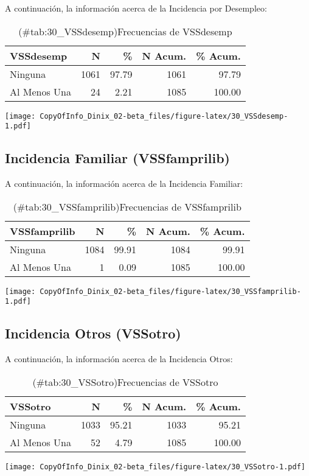 \documentclass[
]{article}
\begin{document}
A continuación, la información acerca de la Incidencia por Desempleo:

\begin{table}

\caption{(\#tab:30_VSSdesemp)Frecuencias de VSSdesemp}
\centering
\begin{tabular}[t]{lrrrr}
\toprule
VSSdesemp & N & \% & N Acum. & \% Acum.\\
\midrule
Ninguna & 1061 & 97.79 & 1061 & 97.79\\
Al Menos Una & 24 & 2.21 & 1085 & 100.00\\
\bottomrule
\end{tabular}
\end{table}

\texttt{[image: CopyOfInfo\_Dinix\_02-beta\_files/figure-latex/30\_VSSdesemp-1.pdf]}

\subsection{Incidencia Familiar (VSSfamprilib)}\label{incidencia-familiar-vssfamprilib}

A continuación, la información acerca de la Incidencia Familiar:

\begin{table}

\caption{(\#tab:30_VSSfamprilib)Frecuencias de VSSfamprilib}
\centering
\begin{tabular}[t]{lrrrr}
\toprule
VSSfamprilib & N & \% & N Acum. & \% Acum.\\
\midrule
Ninguna & 1084 & 99.91 & 1084 & 99.91\\
Al Menos Una & 1 & 0.09 & 1085 & 100.00\\
\bottomrule
\end{tabular}
\end{table}

\texttt{[image: CopyOfInfo\_Dinix\_02-beta\_files/figure-latex/30\_VSSfamprilib-1.pdf]}

\subsection{Incidencia Otros (VSSotro)}\label{incidencia-otros-vssotro}

A continuación, la información acerca de la Incidencia Otros:

\begin{table}

\caption{(\#tab:30_VSSotro)Frecuencias de VSSotro}
\centering
\begin{tabular}[t]{lrrrr}
\toprule
VSSotro & N & \% & N Acum. & \% Acum.\\
\midrule
Ninguna & 1033 & 95.21 & 1033 & 95.21\\
Al Menos Una & 52 & 4.79 & 1085 & 100.00\\
\bottomrule
\end{tabular}
\end{table}

\texttt{[image: CopyOfInfo\_Dinix\_02-beta\_files/figure-latex/30\_VSSotro-1.pdf]}
\end{document}
